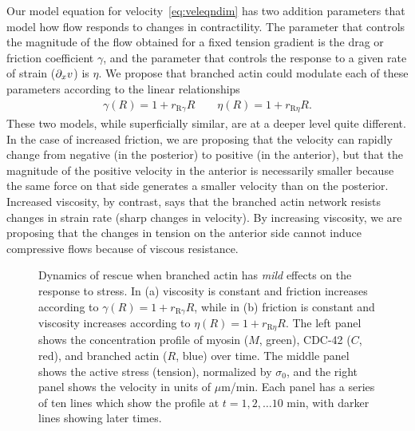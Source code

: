 \documentclass[11pt]{article}
\newcommand{\6}[1]{#1_{\text{6}}}
\newcommand{\3}[1]{#1_{\text{3}}}
\begin{document}
Our model equation for velocity\ \eqref{eq:veleqndim} has two addition parameters that model how flow responds to changes in contractility. The parameter that controls the magnitude of the flow obtained for a fixed tension gradient is the drag or friction coefficient $\gamma$, and the parameter that controls the response to a given rate of strain ($\partial_x v$) is $\eta$. We propose that branched actin could modulate each of these parameters according to the linear relationships
\begin{gather*}
\gamma(R)=1+r_\text{R$\gamma$}R \qquad \eta(R)=1+r_\text{R$\eta$} R.
\end{gather*}
These two models, while superficially similar, are at a deeper level quite different. In the case of increased friction, we are proposing that the velocity can rapidly change from negative (in the posterior) to positive (in the anterior), but that the magnitude of the positive velocity in the anterior is necessarily smaller because the same force on that side generates a smaller velocity than on the posterior. Increased viscosity, by contrast, says that the branched actin network resists changes in strain rate (sharp changes in velocity). By increasing viscosity, we are proposing that the changes in tension on the anterior side cannot induce compressive flows because of viscous resistance.

\begin{figure}
\centering
{}
\caption{\label{fig:BAFric} Dynamics of rescue when branched actin has \emph{mild} effects on the response to stress. In (a) viscosity is constant and friction increases according to $\gamma(R)=1+r_\text{R$\gamma$}R$, while in (b) friction is constant and viscosity increases according to $ \eta(R)=1+r_\text{R$\eta$} R$. The left panel shows the concentration profile of myosin ($M$, green), CDC-42 ($C$, red), and branched actin ($R$, blue) over time. The middle panel shows the active stress (tension), normalized by $\sigma_0$, and the right panel shows the velocity in units of $\mu$m/min. Each panel has a series of ten lines which show the profile at $t=1, 2, \dots 10$ min, with darker lines showing later times.}
\end{figure}
\end{document}
